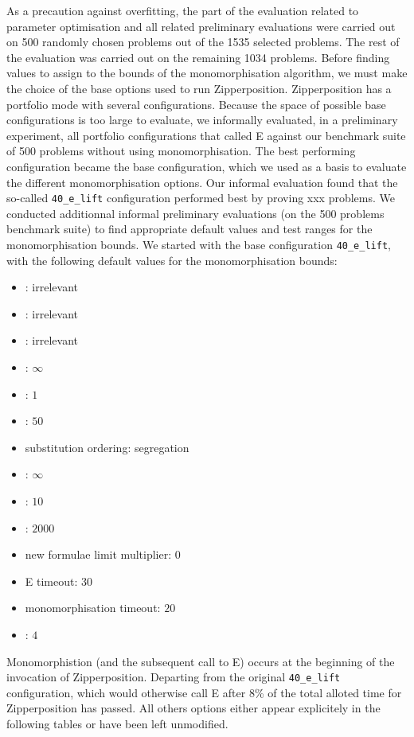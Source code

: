 \documentclass[]{ceurart}
\begin{document}
As a precaution against overfitting, the part of the evaluation related to parameter optimisation and all related preliminary evaluations were carried out on 500 randomly chosen problems out of the 1535 selected problems. The rest of the evaluation was carried out on the remaining 1034 problems. Before finding values to assign to the bounds of the monomorphisation algorithm, we must make the choice of the base options used to run Zipperposition. Zipperposition has a portfolio mode with several configurations. Because the space of possible base configurations is too large to evaluate, we informally evaluated, in a preliminary experiment, all portfolio configurations that called E against our benchmark suite of 500 problems without using monomorphisation. The best performing configuration became the base configuration, which we used as a basis to evaluate the different monomorphisation options. Our informal evaluation found that the so-called \verb|40_e_lift| configuration performed best by proving xxx problems. %
We conducted additionnal informal preliminary evaluations (on the 500 problems benchmark suite) to find appropriate default values and test ranges for the monomorphisation bounds. We started with the base configuration \verb|40_e_lift|, with the following default values for the monomorphisation bounds:

\begin{multicols}{2}%
\begin{itemize}
   \item \MonoCap: irrelevant
   \item \MonoMult: irrelevant
   \item \MonoFloor: irrelevant
   \item \PolyCap: \(\infty\)
   \item \PolyMult: \(1\)
   \item \PolyFloor: \(50\)
   \item substitution ordering: segregation
   \item \SubstLimit: \(\infty\)
   \item \MonoSubstsLimit: \(10\)
   \item \Limit: \(2000\)
   \item new formulae limit multiplier: \(0\)
   \item E timeout: \(30\)
   \item monomorphisation timeout: \(20\)
   \item \Loop: \(4\)
\end{itemize}
\end{multicols}
Monomorphistion (and the subsequent call to E) occurs at the beginning of the invocation of Zipperposition. Departing from the original \verb|40_e_lift| configuration, which would otherwise call E after 8\% of the total alloted time for Zipperposition has passed. All others options either appear explicitely in the following tables or have been left unmodified.
\end{document}
